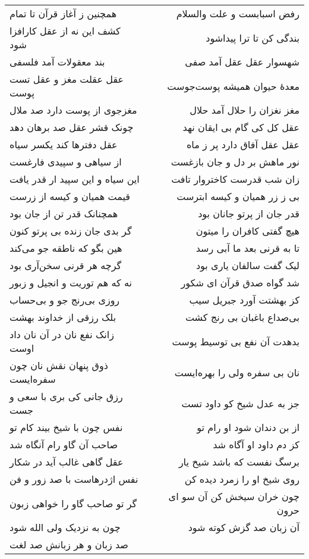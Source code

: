 \begin{center}
\begin{longtable}{l p{0.5cm} r}
همچنین ز آغاز قرآن تا تمام
&&
رفض اسبابست و علت والسلام
\\
کشف این نه از عقل کارافزا شود
&&
بندگی کن تا ترا پیداشود
\\
بند معقولات آمد فلسفی
&&
شهسوار عقل عقل آمد صفی
\\
عقل عقلت مغز و عقل تست پوست
&&
معدهٔ حیوان همیشه پوست‌جوست
\\
مغزجوی از پوست دارد صد ملال
&&
مغز نغزان را حلال آمد حلال
\\
چونک قشر عقل صد برهان دهد
&&
عقل کل کی گام بی ایقان نهد
\\
عقل دفترها کند یکسر سیاه
&&
عقل عقل آفاق دارد پر ز ماه
\\
از سیاهی و سپیدی فارغست
&&
نور ماهش بر دل و جان بازغست
\\
این سیاه و این سپید ار قدر یافت
&&
زان شب قدرست کاختروار تافت
\\
قیمت همیان و کیسه از زرست
&&
بی ز زر همیان و کیسه ابترست
\\
همچنانک قدر تن از جان بود
&&
قدر جان از پرتو جانان بود
\\
گر بدی جان زنده بی پرتو کنون
&&
هیچ گفتی کافران را میتون
\\
هین بگو که ناطقه جو می‌کند
&&
تا به قرنی بعد ما آبی رسد
\\
گرچه هر قرنی سخن‌آری بود
&&
لیک گفت سالفان یاری بود
\\
نه که هم توریت و انجیل و زبور
&&
شد گواه صدق قرآن ای شکور
\\
روزی بی‌رنج جو و بی‌حساب
&&
کز بهشتت آورد جبریل سیب
\\
بلک رزقی از خداوند بهشت
&&
بی‌صداع باغبان بی رنج کشت
\\
زانک نفع نان در آن نان داد اوست
&&
بدهدت آن نفع بی توسیط پوست
\\
ذوق پنهان نقش نان چون سفره‌ایست
&&
نان بی سفره ولی را بهره‌ایست
\\
رزق جانی کی بری با سعی و جست
&&
جز به عدل شیخ کو داود تست
\\
نفس چون با شیخ بیند کام تو
&&
از بن دندان شود او رام تو
\\
صاحب آن گاو رام آنگاه شد
&&
کز دم داود او آگاه شد
\\
عقل گاهی غالب آید در شکار
&&
برسگ نفست که باشد شیخ یار
\\
نفس اژدرهاست با صد زور و فن
&&
روی شیخ او را زمرد دیده کن
\\
گر تو صاحب گاو را خواهی زبون
&&
چون خران سیخش کن آن سو ای حرون
\\
چون به نزدیک ولی الله شود
&&
آن زبان صد گزش کوته شود
\\
صد زبان و هر زبانش صد لغت

\end{longtable}
\end{center}
